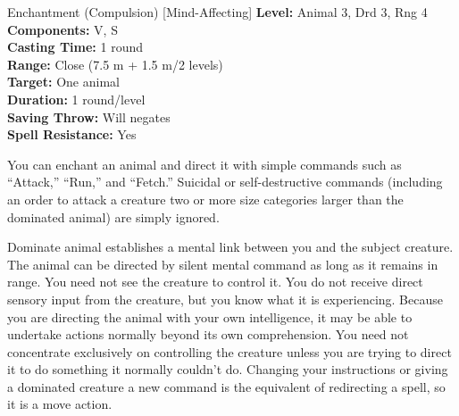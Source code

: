 {Enchantment (Compulsion) [Mind-Affecting]}
{
	\textbf{Level:}
	Animal 3, Drd 3, Rng 4\\
	\textbf{Components:}
	V, S\\
	\textbf{Casting Time:}
	1 round\\
	\textbf{Range:}
	Close (7.5 m + 1.5 m/2 levels)\\
	\textbf{Target:}
	One animal\\
	\textbf{Duration:}
	1 round/level\\
	\textbf{Saving Throw:}
	Will negates\\
	\textbf{Spell Resistance:}
	Yes\\
}
{
	You can enchant an animal and direct it with simple commands such as ``Attack,'' ``Run,'' and ``Fetch.'' Suicidal or self-destructive commands (including an order to attack a creature two or more size categories larger than the dominated animal) are simply ignored.

	Dominate animal establishes a mental link between you and the subject creature. The animal can be directed by silent mental command as long as it remains in range. You need not see the creature to control it. You do not receive direct sensory input from the creature, but you know what it is experiencing. Because you are directing the animal with your own intelligence, it may be able to undertake actions normally beyond its own comprehension. You need not concentrate exclusively on controlling the creature unless you are trying to direct it to do something it normally couldn't do. Changing your instructions or giving a dominated creature a new command is the equivalent of redirecting a spell, so it is a move action.

}
